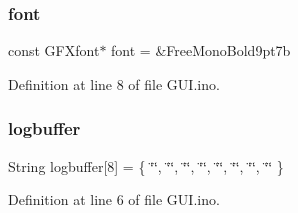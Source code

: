 \subsubsection{\texorpdfstring{font}{font}}
{\footnotesize\ttfamily const G\+F\+Xfont$\ast$ font = \&Free\+Mono\+Bold9pt7b}



Definition at line 8 of file G\+U\+I.\+ino.

\mbox{\label{_g_u_i_8ino_a5ec41fe3f7e063b47e8647028289549f}} 
\subsubsection{\texorpdfstring{logbuffer}{logbuffer}}
{\footnotesize\ttfamily String logbuffer\mbox{[}8\mbox{]} = \{ \char`\"{}\char`\"{}, \char`\"{}\char`\"{}, \char`\"{}\char`\"{}, \char`\"{}\char`\"{}, \char`\"{}\char`\"{}, \char`\"{}\char`\"{}, \char`\"{}\char`\"{}, \char`\"{}\char`\"{} \}}



Definition at line 6 of file G\+U\+I.\+ino.


